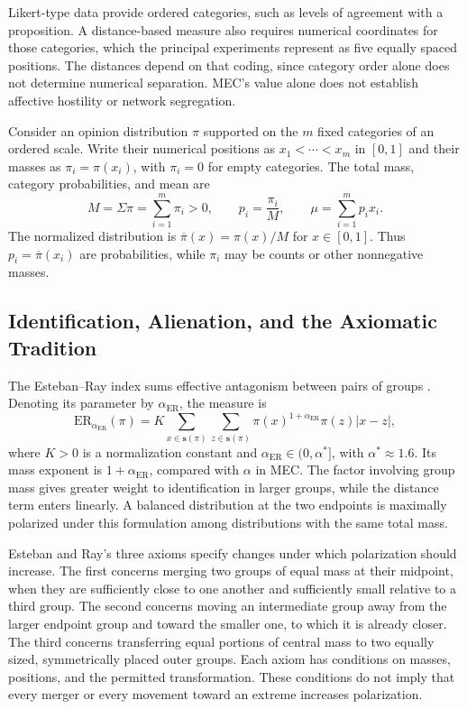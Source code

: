 \documentclass{article}
\theoremstyle{plain}
\theoremstyle{remark}
\begin{document}
Likert-type data provide ordered categories, such as levels of agreement with a proposition. A distance-based measure also requires numerical coordinates for those categories, which the principal experiments represent as five equally spaced positions. The distances depend on that coding, since category order alone does not determine numerical separation. MEC's value alone does not establish affective hostility or network segregation.

Consider an opinion distribution $\pi$ supported on the $m$ fixed categories of an ordered scale. Write their numerical positions as $x_1<\cdots<x_m$ in $[0,1]$ and their masses as $\pi_i=\pi(x_i)$, with $\pi_i=0$ for empty categories. The total mass, category probabilities, and mean are
\begin{equation}\label{eq:lit-probabilities}
M=\Sigma\pi=\sum_{i=1}^{m}\pi_i>0,
\qquad
p_i=\frac{\pi_i}{M},
\qquad
\mu=\sum_{i=1}^{m}p_i x_i.
\end{equation}
The normalized distribution is $\overline{\pi}(x)=\pi(x)/M$ for $x\in[0,1]$. Thus $p_i=\overline{\pi}(x_i)$ are probabilities, while $\pi_i$ may be counts or other nonnegative masses.

\subsection{Identification, Alienation, and the Axiomatic Tradition}\label{subsec:lit-axioms}

The Esteban--Ray index sums effective antagonism between pairs of groups \citep{esteban1994measurement}. Denoting its parameter by $\alpha_{\mathrm{ER}}$, the measure is
\begin{equation}\label{eq:lit-er}
\mathrm{ER}_{\alpha_{\mathrm{ER}}}(\pi)
=K\sum_{x\in\boldsymbol{s}(\pi)}
   \sum_{z\in\boldsymbol{s}(\pi)}
   \pi(x)^{1+\alpha_{\mathrm{ER}}}\pi(z)\lvert x-z\rvert,
\end{equation}
where $K>0$ is a normalization constant and $\alpha_{\mathrm{ER}}\in(0,\alpha^\ast]$, with $\alpha^\ast\approx1.6$. Its mass exponent is $1+\alpha_{\mathrm{ER}}$, compared with $\alpha$ in MEC. The factor involving group mass gives greater weight to identification in larger groups, while the distance term enters linearly. A balanced distribution at the two endpoints is maximally polarized under this formulation among distributions with the same total mass.

Esteban and Ray's three axioms specify changes under which polarization should increase. The first concerns merging two groups of equal mass at their midpoint, when they are sufficiently close to one another and sufficiently small relative to a third group. The second concerns moving an intermediate group away from the larger endpoint group and toward the smaller one, to which it is already closer. The third concerns transferring equal portions of central mass to two equally sized, symmetrically placed outer groups. Each axiom has conditions on masses, positions, and the permitted transformation. These conditions do not imply that every merger or every movement toward an extreme increases polarization.
\end{document}
